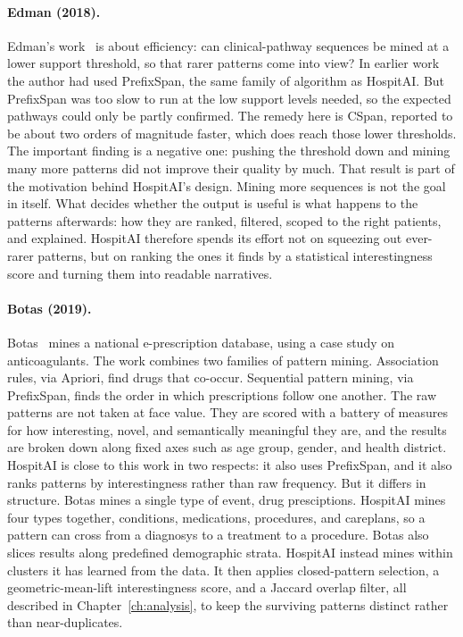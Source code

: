 \paragraph{Edman (2018).}
Edman's work~\cite{edman2018} is about efficiency: can clinical-pathway sequences be mined at a lower support threshold, so that rarer patterns come into view?
In earlier work the author had used PrefixSpan, the same family of algorithm as HospitAI. But PrefixSpan was too slow to run at the low support levels needed, so the expected pathways could only be partly confirmed.
The remedy here is CSpan, reported to be about two orders of magnitude faster, which does reach those lower thresholds.
The important finding is a negative one: pushing the threshold down and mining many more patterns did not improve their quality by much.
That result is part of the motivation behind HospitAI's design. Mining more sequences is not the goal in itself. What decides whether the output is useful is what happens to the patterns afterwards: how they are ranked, filtered, scoped to the right patients, and explained.
HospitAI therefore spends its effort not on squeezing out ever-rarer patterns, but on ranking the ones it finds by a statistical interestingness score and turning them into readable narratives.

\paragraph{Botas (2019).}
Botas~\cite{botas2019} mines a national e-prescription database, using a case study on anticoagulants.
The work combines two families of pattern mining. Association rules, via Apriori, find drugs that co-occur. Sequential pattern mining, via PrefixSpan, finds the order in which prescriptions follow one another.
The raw patterns are not taken at face value. They are scored with a battery of measures for how interesting, novel, and semantically meaningful they are, and the results are broken down along fixed axes such as age group, gender, and health district.
HospitAI is close to this work in two respects: it also uses PrefixSpan, and it also ranks patterns by interestingness rather than raw frequency. But it differs in structure.
Botas mines a single type of event, drug presciptions. HospitAI mines four types together, conditions, medications, procedures, and careplans, so a pattern can cross from a diagnosys to a treatment to a procedure.
Botas also slices results along predefined demographic strata. HospitAI instead mines within clusters it has learned from the data. It then applies closed-pattern selection, a geometric-mean-lift interestingness score, and a Jaccard overlap filter, all described in Chapter~\ref{ch:analysis}, to keep the surviving patterns distinct rather than near-duplicates.

